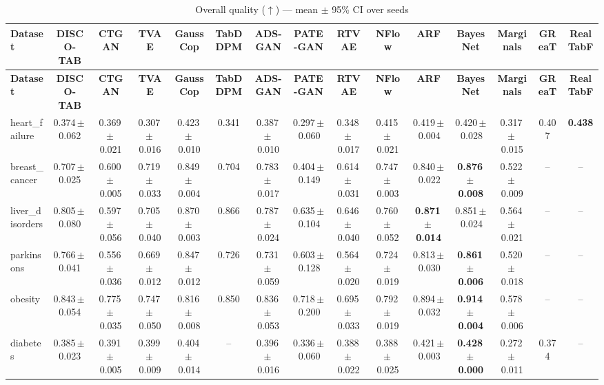 \documentclass[8pt]{extarticle}
\begin{document}
\begin{longtable}{l*{14}{c}}
\caption{Overall quality ($\uparrow$) --- mean $\pm$ 95\% CI over seeds}\\
\toprule
\textbf{Dataset} & \textbf{DISCO-TAB} & \textbf{CTGAN} & \textbf{TVAE} & \textbf{GaussCop} & \textbf{TabDDPM} & \textbf{ADS-GAN} & \textbf{PATE-GAN} & \textbf{RTVAE} & \textbf{NFlow} & \textbf{ARF} & \textbf{BayesNet} & \textbf{Marginals} & \textbf{GReaT} & \textbf{RealTabF} \\
\midrule
\endfirsthead
\toprule
\textbf{Dataset} & \textbf{DISCO-TAB} & \textbf{CTGAN} & \textbf{TVAE} & \textbf{GaussCop} & \textbf{TabDDPM} & \textbf{ADS-GAN} & \textbf{PATE-GAN} & \textbf{RTVAE} & \textbf{NFlow} & \textbf{ARF} & \textbf{BayesNet} & \textbf{Marginals} & \textbf{GReaT} & \textbf{RealTabF} \\
\midrule
\endhead
\bottomrule
\endfoot
heart\_failure & 0.374\,$\pm$\,0.062 & 0.369\,$\pm$\,0.021 & 0.307\,$\pm$\,0.016 & 0.423\,$\pm$\,0.010 & 0.341 & 0.387\,$\pm$\,0.010 & 0.297\,$\pm$\,0.060 & 0.348\,$\pm$\,0.017 & 0.415\,$\pm$\,0.021 & 0.419\,$\pm$\,0.004 & 0.420\,$\pm$\,0.028 & 0.317\,$\pm$\,0.015 & 0.407 & \textbf{0.438} \\
breast\_cancer & 0.707\,$\pm$\,0.025 & 0.600\,$\pm$\,0.005 & 0.719\,$\pm$\,0.033 & 0.849\,$\pm$\,0.004 & 0.704 & 0.783\,$\pm$\,0.017 & 0.404\,$\pm$\,0.149 & 0.614\,$\pm$\,0.031 & 0.747\,$\pm$\,0.003 & 0.840\,$\pm$\,0.022 & \textbf{0.876\,$\pm$\,0.008} & 0.522\,$\pm$\,0.009 & -- & -- \\
liver\_disorders & 0.805\,$\pm$\,0.080 & 0.597\,$\pm$\,0.056 & 0.705\,$\pm$\,0.040 & 0.870\,$\pm$\,0.003 & 0.866 & 0.787\,$\pm$\,0.024 & 0.635\,$\pm$\,0.104 & 0.646\,$\pm$\,0.040 & 0.760\,$\pm$\,0.052 & \textbf{0.871\,$\pm$\,0.014} & 0.851\,$\pm$\,0.024 & 0.564\,$\pm$\,0.021 & -- & -- \\
parkinsons & 0.766\,$\pm$\,0.041 & 0.556\,$\pm$\,0.036 & 0.669\,$\pm$\,0.012 & 0.847\,$\pm$\,0.012 & 0.726 & 0.731\,$\pm$\,0.059 & 0.603\,$\pm$\,0.128 & 0.564\,$\pm$\,0.020 & 0.724\,$\pm$\,0.019 & 0.813\,$\pm$\,0.030 & \textbf{0.861\,$\pm$\,0.006} & 0.520\,$\pm$\,0.018 & -- & -- \\
obesity & 0.843\,$\pm$\,0.054 & 0.775\,$\pm$\,0.035 & 0.747\,$\pm$\,0.050 & 0.816\,$\pm$\,0.008 & 0.850 & 0.836\,$\pm$\,0.053 & 0.718\,$\pm$\,0.200 & 0.695\,$\pm$\,0.033 & 0.792\,$\pm$\,0.019 & 0.894\,$\pm$\,0.032 & \textbf{0.914\,$\pm$\,0.004} & 0.578\,$\pm$\,0.006 & -- & -- \\
diabetes & 0.385\,$\pm$\,0.023 & 0.391\,$\pm$\,0.005 & 0.399\,$\pm$\,0.009 & 0.404\,$\pm$\,0.014 & -- & 0.396\,$\pm$\,0.016 & 0.336\,$\pm$\,0.060 & 0.388\,$\pm$\,0.022 & 0.388\,$\pm$\,0.025 & 0.421\,$\pm$\,0.003 & \textbf{0.428\,$\pm$\,0.000} & 0.272\,$\pm$\,0.011 & 0.374 & -- \\

\end{longtable}
\end{document}
